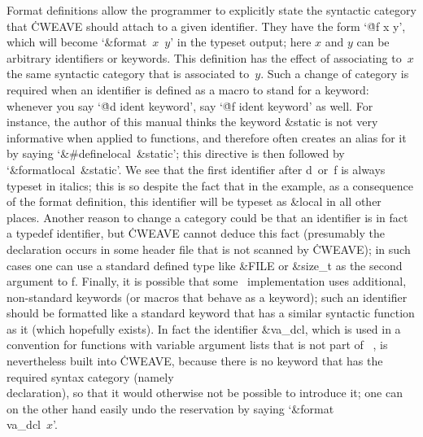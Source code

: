 Format definitions allow the programmer to explicitly state the syntactic
category that \.{CWEAVE} should attach to a given identifier. They have the
form `\.{@f x y}', which will become `\&{format}~$x$~$y$' in the typeset
output; here $x$ and $y$ can be arbitrary identifiers or keywords. This
definition has the effect of associating to~$x$ the same syntactic category
that is associated to~$y$. Such a change of category is required when an
identifier is defined as a macro to stand for a keyword:  whenever you say
`\.{@d ident keyword}', say `\.{@f ident keyword}' as well. For instance,
the author of this manual thinks the keyword \&{static} is not very
informative when applied to functions, and therefore often creates an alias
for it by saying `\hbox{\&{\#define} \\{local} \&{static}}'; this directive
is then followed by `\hbox{\&{format} \\{local} \&{static}}'. We see that
the first identifier after \:d~or~\:f is always typeset in italics; this is
so despite the fact that in the example, as a consequence of the format
definition, this identifier will be typeset as \&{local} in all other
places. Another reason to change a category could be that an identifier is
in fact a typedef identifier, but \.{CWEAVE} cannot deduce this fact
(presumably the declaration occurs in some header file that is not scanned
by \.{CWEAVE}); in such cases one can use a standard defined type like
\&{FILE} or \&{size\_t} as the second argument to \:f. Finally, it is
possible that some \Cee~implementation uses additional, non-standard
keywords (or macros that behave as a keyword); such an identifier should be
formatted like a standard keyword that has a similar syntactic function as
it (which hopefully exists). In fact the identifier \&{va\_dcl}, which is
used in a convention for functions with variable argument lists that is not
part of ~\Cee, is nevertheless built into \.{CWEAVE}, because
there is no keyword that has the required syntax category (namely
\\{declaration}), so that it would otherwise not be possible to introduce
it; one can on the other hand easily undo the reservation by saying
`\&{format}~\\{va\_dcl}~$x$'.

